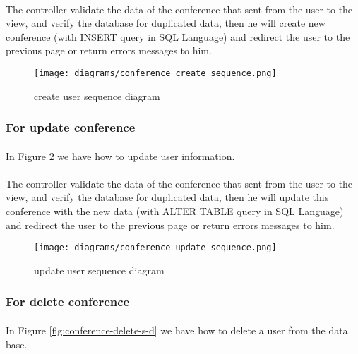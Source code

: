 	\paragraph{}
	The controller validate the data of the conference that sent from the user to the view, and verify the database for duplicated data, then he will create new conference (with INSERT query in SQL Language) and redirect the user to the previous page or return errors messages to him.
	
		\begin{figure}[!ht]
			\centering
			\texttt{[image: diagrams/conference\_create\_sequence.png]}
			\caption{create user sequence diagram}
			\label{fig:conference-create-s-d}
		\end{figure}
	
	\subsubsection{For update conference}
	\paragraph{}
	In Figure \ref{fig:conference-update-s-d} we have how to update user information.
	\paragraph{}
	The controller validate the data of the conference that sent from the user to the view, and verify the database for duplicated data, then he will update this conference with the new data (with ALTER TABLE query in SQL Language) and redirect the user to the previous page or return errors messages to him.
	
		\begin{figure}[!ht]
			\centering
			\texttt{[image: diagrams/conference\_update\_sequence.png]}
			\caption{update user sequence diagram}
			\label{fig:conference-update-s-d}
		\end{figure}
	
	\subsubsection{For delete conference}
	\paragraph{}
	In Figure \ref{fig:conference-delete-s-d} we have how to delete a user from the data base.
